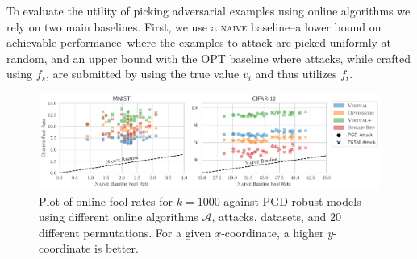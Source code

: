 {}

To evaluate the utility of picking adversarial examples using online algorithms we rely on two main baselines. First, we use a \textsc{naive} baseline--a lower bound on achievable performance--where the examples to attack are picked uniformly at random, and an upper bound with the \textsc{OPT} baseline where attacks, while crafted using $f_s$, are submitted by using the true value $v_i$ and thus utilizes $f_t$.%
\setlength{\textfloatsep}{5pt}%
\begin{figure}[t]
    \centering
    \includegraphics[width=.9\linewidth]{Figures/scatterplot_Q1.pdf}
    \caption{ \small
    Plot of online fool rates for $k=1000$ against PGD-robust models using different online algorithms $\mathcal{A}$, attacks, datasets, and $20$ different permutations. For a given $x$-coordinate, a higher $y$-coordinate is better.} %
    \label{fig:scatter}
\end{figure}

